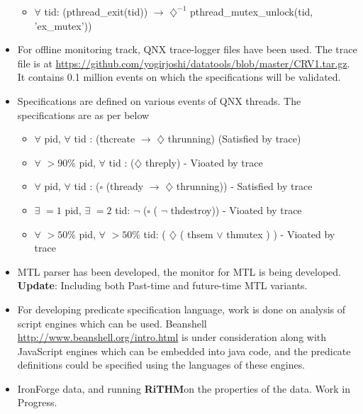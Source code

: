 \documentclass[]{article}
\newcommand{\rithm}{\textbf{RiTHM}\space}
\begin{document}
\begin{itemize}
\begin{itemize}
		\item $\forall$ tid: (pthread\_exit(tid)) $\longrightarrow$ $\diamondsuit^{-1}$ pthread\_mutex\_unlock(tid, 'ex\_mutex'))
	\end{itemize}
	\item For offline monitoring track, QNX trace-logger files have been used. The trace file is at \url{https://github.com/yogirjoshi/datatools/blob/master/CRV1.tar.gz}. It contains 0.1 million events on which the specifications will be validated.
	\item Specifications are defined on various events of QNX threads. The specifications are as per below
	\begin{itemize}
		\item $\forall$  pid, $\forall$ tid : (thcreate $\longrightarrow$  $\diamondsuit$ thrunning)  (Satisfied by trace)
		\item $\forall$ $>90\%$ pid, $\forall$ tid : ($\diamondsuit$ threply) - Vioated by trace
		\item $\forall$  pid, $\forall$ tid : ($\square$ (thready $\longrightarrow$   $\diamondsuit$ thrunning)) - Satisfied by trace
		\item $\exists$ $=1$ pid, $\exists$ $=2$ tid: $\lnot$ ($\square$ ( $\lnot$ thdestroy)) - Vioated by trace
		\item $\forall$ $>50\%$ pid, $\forall$ $>50\%$ tid: ( $\diamondsuit$ ( thsem $\vee$ thmutex ) ) - Vioated by trace
	\end{itemize}
	
	\item MTL parser has been developed, the monitor for MTL is being developed. \textbf{Update}: Including both Past-time and future-time MTL variants. 
	\item For developing predicate specification language, work is done on analysis of script engines which can be used. Beanshell \url{http://www.beanshell.org/intro.html} is under consideration along with JavaScript engines which can be embedded into java code, and the predicate definitions could be specified using the languages of these engines.
	
	\item IronForge data, and running \rithm on the properties of the data. Work in Progress.
	

\end{itemize}
\end{document}
